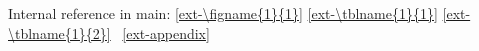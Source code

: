\documentclass[12pt,twoside]{report}
\begin{document}

\cleardoublepage


\cleardoublepage

\pagestyle{empty}

\cleardoublepage

\tableofcontents
\clearpage
\listoffigures
\clearpage
\listoftables









Internal reference in main:
\ref{ext-\figname{1}{1}}
\ref{ext-\tblname{1}{1}}
\ref{ext-\tblname{1}{2}}
\APPENDIX~\ref{ext-appendix}


\newpage
\appendix



\end{document}
